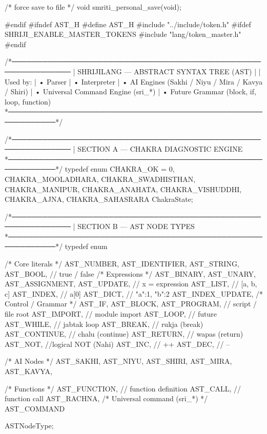 \documentclass{article}
\begin{document}
/* force save to file */
void smriti_personal_save(void);

#endif
#ifndef AST_H
#define AST_H
#include "../include/token.h"
#ifdef SHRIJI_ENABLE_MASTER_TOKENS
#include "lang/token_master.h"
#endif

/*──────────────────────────────────────────────────────────────
 |  SHRIJILANG — ABSTRACT SYNTAX TREE (AST)
 |
 |  Used by:
 |   • Parser
 |   • Interpreter
 |   • AI Engines (Sakhi / Niyu / Mira / Kavya / Shiri)
 |   • Universal Command Engine (sri_*)
 |   • Future Grammar (block, if, loop, function)
 *────────────────────────────────────────────────────────────*/

/*──────────────────────────────────────────────────────────────
 |  SECTION A — CHAKRA DIAGNOSTIC ENGINE
 *────────────────────────────────────────────────────────────*/
typedef enum {
    CHAKRA_OK = 0,
    CHAKRA_MOOLADHARA,
    CHAKRA_SWADHISTHAN,
    CHAKRA_MANIPUR,
    CHAKRA_ANAHATA,
    CHAKRA_VISHUDDHI,
    CHAKRA_AJNA,
    CHAKRA_SAHASRARA
} ChakraState;


/*──────────────────────────────────────────────────────────────
 |  SECTION B — AST NODE TYPES
 *────────────────────────────────────────────────────────────*/
typedef enum {

    /* Core literals */
    AST_NUMBER,
    AST_IDENTIFIER,
    AST_STRING,
    AST_BOOL,        // true / false
    /* Expressions */
    AST_BINARY,
    AST_UNARY,
    AST_ASSIGNMENT,
    AST_UPDATE,        // x = expression
    AST_LIST,          // [a, b, c]
    AST_INDEX,         // a[0]
    AST_DICT,          // {"a":1, "b":2}
    AST_INDEX_UPDATE,
/* Control / Grammar */
    AST_IF,
    AST_BLOCK,
    AST_PROGRAM,     // script / file root
    AST_IMPORT,      // module import
    AST_LOOP,        // future
    AST_WHILE,       // jabtak loop
    AST_BREAK,       // rukja (break)
    AST_CONTINUE,    // chalu (continue)
    AST_RETURN,      // wapas (return)
    AST_NOT,    //logical NOT (Nahi)
    AST_INC,         // ++
    AST_DEC,         // --

    /* AI Nodes */
    AST_SAKHI,
    AST_NIYU,
    AST_SHIRI,
    AST_MIRA,
    AST_KAVYA,

/* Functions */
    AST_FUNCTION,      // function definition
    AST_CALL,          // function call
    AST_RACHNA,
    /* Universal command (sri_*) */
    AST_COMMAND

} ASTNodeType;
\end{document}
